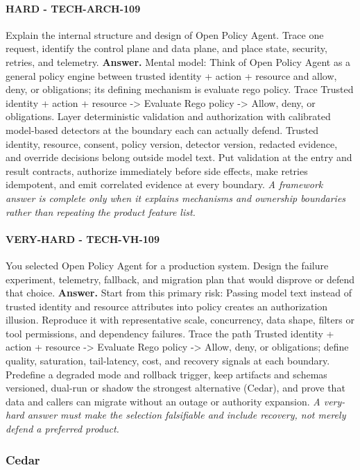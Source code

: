 \paragraph{HARD - TECH-ARCH-109} Explain the internal structure and design of Open Policy Agent. Trace one request, identify the control plane and data plane, and place state, security, retries, and telemetry.
\textbf{Answer.} Mental model: Think of Open Policy Agent as a general policy engine between trusted identity + action + resource and allow, deny, or obligations; its defining mechanism is evaluate rego policy. Trace Trusted identity + action + resource -> Evaluate Rego policy -> Allow, deny, or obligations. Layer deterministic validation and authorization with calibrated model-based detectors at the boundary each can actually defend. Trusted identity, resource, consent, policy version, detector version, redacted evidence, and override decisions belong outside model text. Put validation at the entry and result contracts, authorize immediately before side effects, make retries idempotent, and emit correlated evidence at every boundary.
\textit{A framework answer is complete only when it explains mechanisms and ownership boundaries rather than repeating the product feature list.}
\paragraph{VERY-HARD - TECH-VH-109} You selected Open Policy Agent for a production system. Design the failure experiment, telemetry, fallback, and migration plan that would disprove or defend that choice.
\textbf{Answer.} Start from this primary risk: Passing model text instead of trusted identity and resource attributes into policy creates an authorization illusion. Reproduce it with representative scale, concurrency, data shape, filters or tool permissions, and dependency failures. Trace the path Trusted identity + action + resource -> Evaluate Rego policy -> Allow, deny, or obligations; define quality, saturation, tail-latency, cost, and recovery signals at each boundary. Predefine a degraded mode and rollback trigger, keep artifacts and schemas versioned, dual-run or shadow the strongest alternative (Cedar), and prove that data and callers can migrate without an outage or authority expansion.
\textit{A very-hard answer must make the selection falsifiable and include recovery, not merely defend a preferred product.}
\subsubsection*{Cedar}
